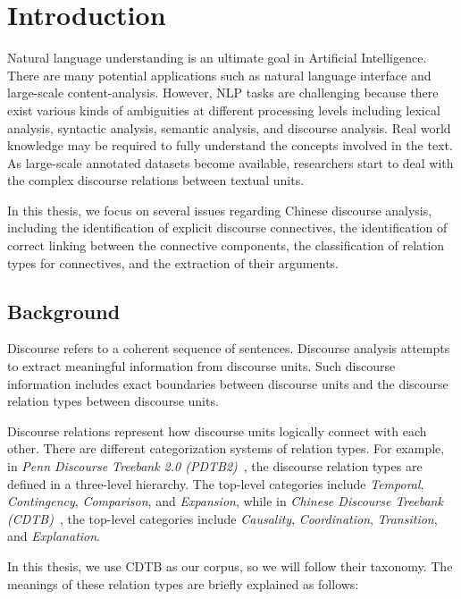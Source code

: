 %
%
%
\chapter{Introduction}
\label{c:intro}

Natural language understanding is an ultimate goal in Artificial
Intelligence. There are many potential applications such as natural language
interface and large-scale content-analysis. However, NLP tasks are
challenging because there exist various kinds of ambiguities at different processing levels
including lexical analysis, syntactic analysis, semantic analysis, and discourse analysis.
Real world knowledge may be required to fully understand the concepts involved in the text.
As large-scale annotated datasets become available, researchers
start to deal with the complex discourse relations between textual units.

In this thesis, we focus on several issues regarding Chinese discourse analysis,
including the identification of explicit discourse connectives,
the identification of correct linking between the connective components,
the classification of relation types for connectives,
and the extraction of their arguments.

%
%
\section{Background}

Discourse refers to a coherent sequence of sentences.
Discourse analysis attempts to extract meaningful information from
discourse units. Such discourse information includes exact boundaries
between discourse units and the discourse relation types between
discourse units.

Discourse relations represent how discourse units logically connect
with each other. There are different categorization systems of relation types.
For example, in
\textit{Penn Discourse Treebank 2.0 (PDTB2)}~\citep{Prasad08thepenn}, the discourse
relation types are defined in a three-level hierarchy. The top-level categories
include \textit{Temporal}, \textit{Contingency}, \textit{Comparison},
and \textit{Expansion}, while in
\textit{Chinese Discourse Treebank (CDTB)}~\citep{li2014building},
the top-level categories include \textit{Causality}, \textit{Coordination},
\textit{Transition}, and \textit{Explanation}.

In this thesis, we use CDTB as our corpus, so we will follow their taxonomy.
The meanings of these relation types are briefly explained as follows:

